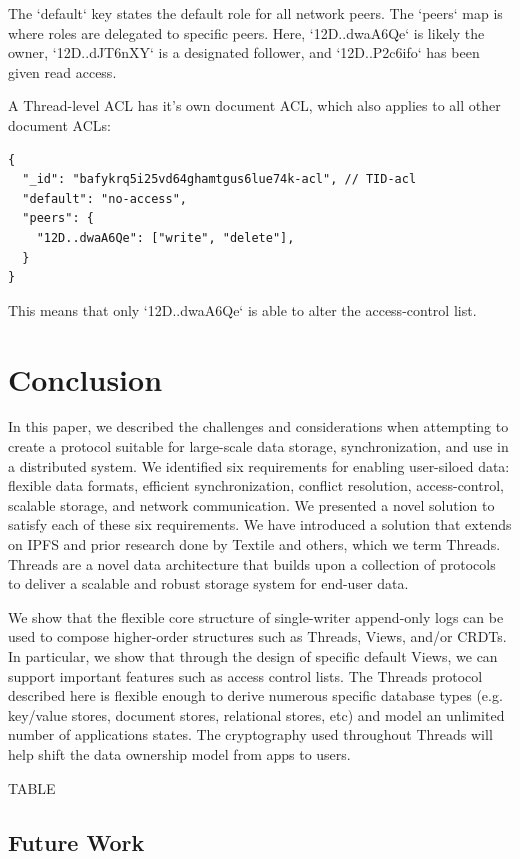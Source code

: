 \documentclass{comjnl}
\begin{document}
The `default` key states the default role for all network peers. The `peers` map is where roles are delegated to specific peers. Here, `12D..dwaA6Qe` is likely the owner, `12D..dJT6nXY` is a designated follower, and `12D..P2c6ifo` has been given read access.

 A Thread-level ACL has it’s own document ACL, which also applies to all other document ACLs:


\begin{lstlisting}
{
  "_id": "bafykrq5i25vd64ghamtgus6lue74k-acl", // TID-acl
  "default": "no-access",
  "peers": {
    "12D..dwaA6Qe": ["write", "delete"],
  }
}
\end{lstlisting}

This means that only `12D..dwaA6Qe` is able to alter the access-control list.

\section{Conclusion}

In this paper, we described the challenges and considerations when attempting to create a protocol suitable for large-scale data storage, synchronization, and use in a distributed system. We identified six requirements for enabling user-siloed data: flexible data formats, efficient synchronization, conflict resolution, access-control, scalable storage, and network communication. We presented a novel solution to satisfy each of these six requirements. We have introduced a solution that extends on IPFS and prior research done by Textile and others, which we term Threads. Threads are a novel data architecture that builds upon a collection of protocols to deliver a scalable and robust storage system for end-user data. 

We show that the flexible core structure of single-writer append-only logs can be used to compose higher-order structures such as Threads, Views, and/or CRDTs. In particular, we show that through the design of specific default Views, we can support important features such as access control lists. The Threads protocol described here is flexible enough to derive numerous specific database types (e.g. key/value stores, document stores, relational stores, etc) and model an unlimited number of applications states. The cryptography used throughout Threads will help shift the data ownership model from apps to users. 

TABLE

\subsection{Future Work}
\end{document}
